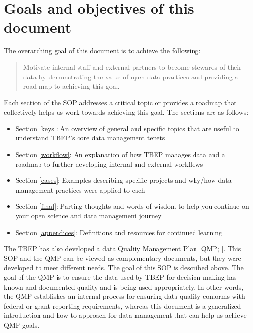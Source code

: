 \documentclass[
]{book}
\providecommand{\tightlist}{%
  \setlength{\itemsep}{0pt}\setlength{\parskip}{0pt}}
\begin{document}
\hypertarget{goals-and-objectives-of-this-document}{%
\section{Goals and objectives of this document}\label{goals-and-objectives-of-this-document}}

The overarching goal of this document is to achieve the following:

\begin{quote}
Motivate internal staff and external partners to become stewards of their data by demonstrating the value of open data practices and providing a road map to achieving this goal.
\end{quote}

Each section of the SOP addresses a critical topic or provides a roadmap that collectively helps us work towards achieving this goal. The sections are as follows:

\begin{itemize}
\tightlist
\item
  Section \ref{keys}: An overview of general and specific topics that are useful to understand TBEP's core data management tenets
\item
  Section \ref{workflow}: An explanation of how TBEP manages data and a roadmap to further developing internal and external workflows
\item
  Section \ref{cases}: Examples describing specific projects and why/how data management practices were applied to each
\item
  Section \ref{final}: Parting thoughts and words of wisdom to help you continue on your open science and data management journey
\item
  Section \ref{appendices}: Definitions and resources for continued learning
\end{itemize}

The TBEP has also developed a data \href{https://drive.google.com/file/d/1DyA0PNHV8rEXGMwGiyS7sXY1ECLYpJJO/view}{Quality Management Plan} {[}QMP; \citet{tbep1620}{]}. This SOP and the QMP can be viewed as complementary documents, but they were developed to meet different needs. The goal of this SOP is described above. The goal of the QMP is to ensure the data used by TBEP for decision-making has known and documented quality and is being used appropriately. In other words, the QMP establishes an internal process for ensuring data quality conforms with federal or grant-reporting requirements, whereas this document is a generalized introduction and how-to approach for data management that can help us achieve QMP goals.
\end{document}
